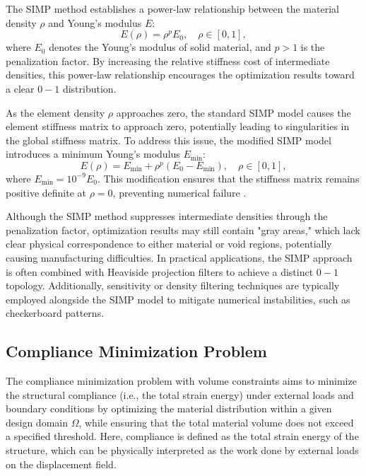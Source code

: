 \documentclass[mathpazo]{cicp}
\begin{document}
The SIMP method establishes a power-law relationship between the material density $\rho$ and Young's modulus $E$:
\begin{equation*}
	E(\rho) = \rho^p E_0,\quad \rho \in [0,1],
\end{equation*}
where $E_0$ denotes the Young's modulus of solid material, and $p>1$ is the penalization factor. By increasing the relative stiffness cost of intermediate densities, this power-law relationship encourages the optimization results toward a clear $0-1$ distribution.

As the element density $\rho$ approaches zero, the standard SIMP model causes the element stiffness matrix to approach zero, potentially leading to singularities in the global stiffness matrix. To address this issue, the modified SIMP model introduces a minimum Young's modulus $E_{\min}$:
\begin{equation*}
	E(\rho) = E_{\min} + \rho^p(E_0 - E_{\min}),\quad \rho \in [0,1],
\end{equation*}
where $E_{\min} = 10^{-9} E_0$. This modification ensures that the stiffness matrix remains positive definite at $\rho = 0$, preventing numerical failure \cite{sigmund2007morphology}.

Although the SIMP method suppresses intermediate densities through the penalization factor, optimization results may still contain "gray areas," which lack clear physical correspondence to either material or void regions, potentially causing manufacturing difficulties. In practical applications, the SIMP approach is often combined with Heaviside projection filters to achieve a distinct $0-1$ topology. Additionally, sensitivity or density filtering techniques are typically employed alongside the SIMP model to mitigate numerical instabilities, such as checkerboard patterns.

\subsection{Compliance Minimization Problem}
The compliance minimization problem with volume constraints aims to minimize the structural compliance (i.e., the total strain energy) under external loads and boundary conditions by optimizing the material distribution within a given design domain $\Omega$, while ensuring that the total material volume does not exceed a specified threshold. Here, compliance is defined as the total strain energy of the structure, which can be physically interpreted as the work done by external loads on the displacement field.
\end{document}
